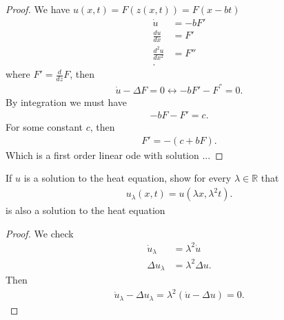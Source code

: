 \begin{proof}
 We have $u(x,t) = F(z(x,t)) = F(x-bt)$
 \begin{align*}
   \dot{u}  &=  -b F' \\
   \frac{du}{dx} &=  F'  \\
   \frac{d^2u}{dx^2} &= F''  \\
 .\end{align*}
 where $F' = \frac{d}{dz} F$, then 
 \begin{align*}
  \dot{u}  - \Delta  F = 0 \leftrightarrow -b F' - F^{''}  = 0
 .\end{align*}
 By integration we must have 
 \begin{align*}
  -b F - F' = c
 .\end{align*}
 For some constant $c$, then 
 \begin{align*}
  F' = -(c + bF)
 .\end{align*}
 Which is a first order linear ode with solution  ...
\end{proof}
\begin{exercise}[d]
  If $u$ is a solution to the heat equation, show for every $\lambda  \in  \mathbb{R}$ that 
  \begin{align*}
    u_{\lambda }(x,t) = u(\lambda x, \lambda ^2t)
  .\end{align*}
 is also a solution to the heat equation 
\end{exercise}
\begin{proof}
 We check 
 \begin{align*}
   \dot{u}_\lambda  &= \lambda^2 \dot{u}   \\
   \Delta u_\lambda  &= \lambda^2 \Delta u 
 .\end{align*}
 Then 
 \begin{align*}
  \dot{u}_\lambda - \Delta u_\lambda =  \lambda ^2(\dot{u}- \Delta u  ) =  0
  .\end{align*}
\end{proof}
\newpage

